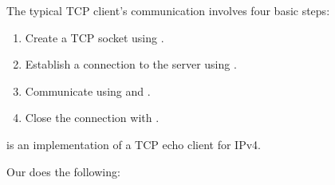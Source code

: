 The typical TCP client's communication involves four basic steps:
%
\begin{enumerate}

\item Create a TCP socket using .

\item Establish a connection to the server using
.

\item Communicate using  and
.

\item Close the connection with .
%
\end{enumerate}

\noindent {} is an implementation of a TCP echo client for
IPv4.



Our  does the following:

